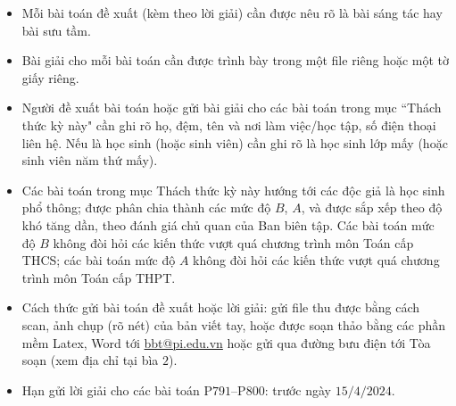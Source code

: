 \thispagestyle{thachthuctoanhocnone}
\pagestyle{thachthuctoanhoc}
\everymath{\color{thachthuctoanhoc}}
\graphicspath{{../thachthuctoanhoc/pic/}}
\begingroup
{}
\centering
\vspace*{4cm}
\endgroup
\vspace*{-8pt}
\begin{tBox}
	\begin{itemize}[leftmargin = 13pt, itemsep = 1.0pt] 
		\item Mỗi bài toán đề xuất (kèm theo lời giải) cần được nêu rõ là bài sáng tác hay bài sưu tầm.
		\item Bài giải cho mỗi bài toán cần được trình bày trong một file riêng hoặc
		một tờ giấy riêng.
		\item  Người đề xuất bài toán hoặc gửi bài giải cho các bài toán trong mục ``Thách thức kỳ này" cần ghi rõ họ, đệm, tên và nơi làm việc/học tập, số điện thoại liên hệ. Nếu là học sinh (hoặc sinh viên) cần ghi rõ là học sinh lớp mấy (hoặc sinh viên năm thứ mấy).
		\item Các bài toán trong mục Thách thức kỳ này hướng tới các độc giả là học sinh phổ thông; được phân chia thành các mức độ $B$, $A$, và được sắp xếp theo độ khó tăng dần, theo đánh giá chủ quan của Ban biên tập. Các bài toán mức độ $B$ không đòi hỏi các kiến thức vượt quá chương trình môn Toán cấp THCS; các bài toán mức độ $A$ không đòi hỏi các kiến thức vượt quá chương trình môn Toán cấp THPT.
		\item Cách thức gửi bài toán đề xuất hoặc lời giải: gửi file thu được bằng cách scan, ảnh chụp (rõ nét) của bản viết tay, hoặc được soạn thảo bằng các phần mềm Latex, Word tới \url{bbt@pi.edu.vn} hoặc gửi qua đường bưu điện tới Tòa soạn (xem địa chỉ tại bìa $2$).
		\item Hạn gửi lời giải cho các bài toán P$791$--P$800$: trước ngày $15/4/2024$.
	\end{itemize}
\end{tBox}
